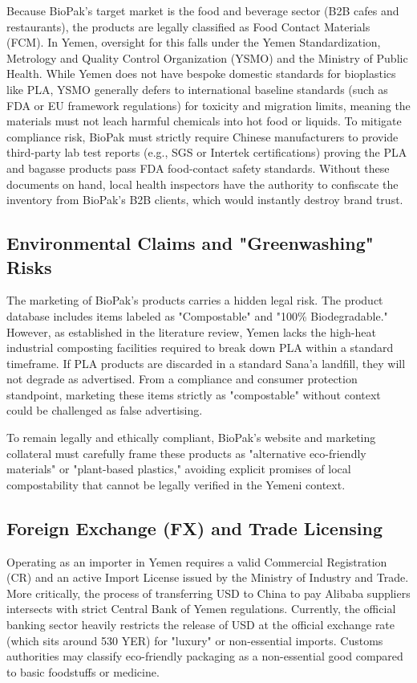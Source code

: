 \documentclass[12pt,a4paper]{article}
\begin{document}
Because BioPak's target market is the food and beverage sector (B2B cafes and restaurants), the products are legally classified as Food Contact Materials (FCM). In Yemen, oversight for this falls under the Yemen Standardization, Metrology and Quality Control Organization (YSMO) and the Ministry of Public Health. While Yemen does not have bespoke domestic standards for bioplastics like PLA, YSMO generally defers to international baseline standards (such as FDA or EU framework regulations) for toxicity and migration limits, meaning the materials must not leach harmful chemicals into hot food or liquids. To mitigate compliance risk, BioPak must strictly require Chinese manufacturers to provide third-party lab test reports (e.g., SGS or Intertek certifications) proving the PLA and bagasse products pass FDA food-contact safety standards. Without these documents on hand, local health inspectors have the authority to confiscate the inventory from BioPak's B2B clients, which would instantly destroy brand trust.

\subsection{Environmental Claims and "Greenwashing" Risks}

The marketing of BioPak's products carries a hidden legal risk. The product database includes items labeled as "Compostable" and "100\% Biodegradable." However, as established in the literature review, Yemen lacks the high-heat industrial composting facilities required to break down PLA within a standard timeframe. If PLA products are discarded in a standard Sana'a landfill, they will not degrade as advertised. From a compliance and consumer protection standpoint, marketing these items strictly as "compostable" without context could be challenged as false advertising.

To remain legally and ethically compliant, BioPak's website and marketing collateral must carefully frame these products as "alternative eco-friendly materials" or "plant-based plastics," avoiding explicit promises of local compostability that cannot be legally verified in the Yemeni context.

\subsection{Foreign Exchange (FX) and Trade Licensing}

Operating as an importer in Yemen requires a valid Commercial Registration (CR) and an active Import License issued by the Ministry of Industry and Trade. More critically, the process of transferring USD to China to pay Alibaba suppliers intersects with strict Central Bank of Yemen regulations. Currently, the official banking sector heavily restricts the release of USD at the official exchange rate (which sits around 530 YER) for "luxury" or non-essential imports. Customs authorities may classify eco-friendly packaging as a non-essential good compared to basic foodstuffs or medicine.
\end{document}
